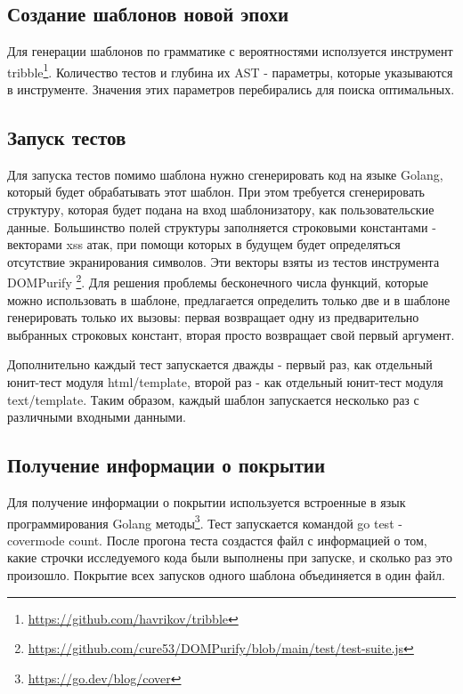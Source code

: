 \documentclass[a4paper]{article}
\begin{document}
\subsection{Создание шаблонов новой эпохи}

Для генерации шаблонов по грамматике с вероятностями исползуется инструмент tribble\footnote{\href{https://github.com/havrikov/tribble}{https://github.com/havrikov/tribble}}. Количество тестов и глубина их AST - параметры, которые указываются в инструменте. Значения этих параметров перебирались для поиска оптимальных.

\subsection{Запуск тестов}

Для запуска тестов помимо шаблона нужно сгенерировать код на языке Golang, который будет обрабатывать этот шаблон. При этом требуется сгенерировать структуру, которая будет подана на вход шаблонизатору, как пользовательские данные. Большинство полей структуры заполняется строковыми константами - векторами xss атак, при помощи которых в будущем будет определяться отсутствие экранирования символов. Эти векторы взяты из тестов инструмента DOMPurify \footnote{\href{https://github.com/cure53/DOMPurify/blob/main/test/test-suite.js}{https://github.com/cure53/DOMPurify/blob/main/test/test-suite.js}}. 
Для решения проблемы бесконечного числа функций, которые можно использовать в шаблоне, предлагается определить только две и в шаблоне генерировать только их вызовы: первая возвращает одну из предварительно выбранных строковых констант, вторая просто возвращает свой первый аргумент. 

Дополнительно каждый тест запускается дважды - первый раз, как отдельный юнит-тест модуля html/template, второй раз - как отдельный юнит-тест модуля text/template. Таким образом, каждый шаблон запускается несколько раз с различными входными данными.



\subsection{Получение информации о покрытии}

Для получение информации о покрытии используется встроенные в язык программирования Golang методы\footnote{\href{https://go.dev/blog/cover}{https://go.dev/blog/cover}}. Тест запускается командой go test -covermode count. После прогона теста создастся файл с информацией о том, какие строчки исследуемого кода были выполнены при запуске, и сколько раз это произошло. Покрытие всех запусков одного шаблона объединяется в один файл. 
\end{document}
